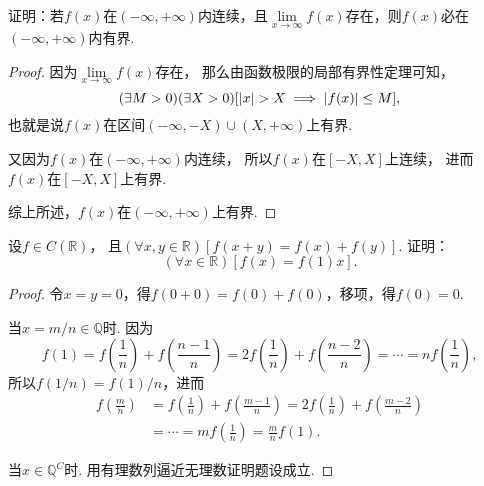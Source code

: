 \begin{example}
证明：若\(f(x)\)在\((-\infty,+\infty)\)内连续，且\(\lim\limits_{x \to \infty}f(x)\)存在，则\(f(x)\)必在\((-\infty,+\infty)\)内有界.
\begin{proof}
因为\(\lim\limits_{x \to \infty} f(x)\)存在，
那么由函数极限的局部有界性定理可知，\[
	(\exists M>0)
	(\exists X>0)
	[
		\abs{x} > X \implies \abs{f(x)} \leq M
	],
\]
也就是说\(f(x)\)在区间\((-\infty,-X)\cup(X,+\infty)\)上有界.

又因为\(f(x)\)在\((-\infty,+\infty)\)内连续，
所以\(f(x)\)在\([-X,X]\)上连续，
进而\(f(x)\)在\([-X,X]\)上有界.

综上所述，\(f(x)\)在\((-\infty,+\infty)\)上有界.
\end{proof}
\end{example}

\begin{example}
设\(f \in C(\mathbb{R})\)，
且\((\forall x,y\in\mathbb{R})[f(x+y) = f(x) + f(y)]\).
证明：\[
	(\forall x\in\mathbb{R})[f(x) = f(1) x].
\]
\begin{proof}
\def\f#1#2{f\left(\frac{#1}{#2}\right)}
令\(x=y=0\)，得\(f(0+0) = f(0) + f(0)\)，移项，得\(f(0) = 0\).

当\(x = m/n \in \mathbb{Q}\)时.
因为\[
	f(1) = \f{1}{n} + \f{n-1}{n}
	= 2 \f{1}{n} + \f{n-2}{n}
	= \dotsb
	= n \f{1}{n},
\]
所以\(f(1/n) = f(1) / n\)，进而\[
	\begin{split}
	\f{m}{n}
	&= \f{1}{n} + \f{m-1}{n}
	= 2 \f{1}{n} + \f{m-2}{n} \\
	&= \dotsb
	= m \f{1}{n} = \frac{m}{n} f(1).
	\end{split}
\]

当\(x \in \mathbb{Q}^C\)时.
用有理数列逼近无理数证明题设成立.
\end{proof}
\end{example}

%
%
%

